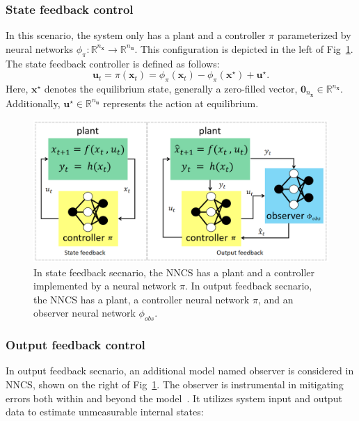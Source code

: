 \documentclass[conference]{IEEEtran}
\newcommand{\nncs}{\textsc{NNCS}\xspace}
\newcommand{\myvec}[1]{\boldsymbol{#1}}
\newcommand{\bbR}{\mathbb{R}}
\begin{document}
\subsubsection{State feedback control}
In this scenario, the system only has a plant and a 
controller $\pi$ parameterized by neural networks 
$\phi_{\pi}:\bbR^{n_{\myvec{x}}} \to \bbR^{n_{\myvec{u}}}$. 
This configuration is depicted in the left of 
Fig~\ref{fig:two_feedback_secnarios}. 
The state feedback controller is defined as follows:
\begin{equation}\label{eq:state_feedback_control}
\myvec{u}_{t} = \pi(\myvec{x}_{t}) = 
\phi_{\pi}(\myvec{x}_{t}) - \phi_{\pi}(\myvec{x}^{\star}) + 
\myvec{u}^{\star}.
\end{equation}
Here, $\myvec{x}^{\star}$ denotes the equilibrium state, 
generally a zero-filled vector, 
$\myvec{0}_{n_{\myvec{x}}} \in \bbR^{n_{\myvec{x}}}$. 
Additionally, $\myvec{u}^{\star} \in \bbR^{n_{\myvec{u}}}$ represents the 
action at equilibrium. 
\begin{figure}[htbp]
    \centerline{\includegraphics[width=0.9\columnwidth]{figures/feedback.png}}
    \caption{In state feedback secnario, the \nncs has a plant and a controller 
    implemented by a neural network $\pi$. In output feedback secnario, the \nncs has a plant, a controller neural network $\pi$, 
    and an observer neural network $\phi_{obs}$.}
    \label{fig:two_feedback_secnarios}
\end{figure}

\subsubsection{Output feedback control}
In output feedback secnario, an additional model named 
observer is considered in \nncs, 
shown on the right of Fig~\ref{fig:two_feedback_secnarios}. 
The observer is instrumental in mitigating errors 
both within and beyond the model~\cite{luenberger1971introduction,crary1990techniques,chen2015disturbance}. 
It utilizes system input and output data  
to estimate unmeasurable internal states:
\end{document}
